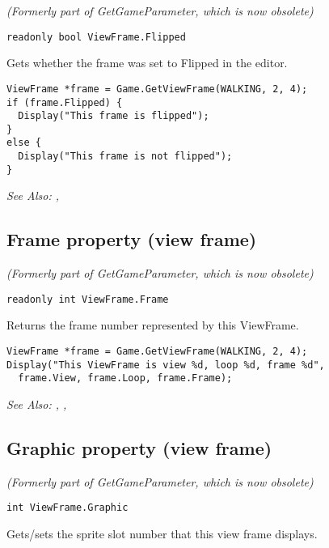 \it{(Formerly part of GetGameParameter, which is now obsolete)}

\begin{verbatim}
readonly bool ViewFrame.Flipped
\end{verbatim}
Gets whether the frame was set to Flipped in the editor.

\begin{verbatim}
ViewFrame *frame = Game.GetViewFrame(WALKING, 2, 4);
if (frame.Flipped) {
  Display("This frame is flipped");
}
else {
  Display("This frame is not flipped");
}
\end{verbatim}

\it{See Also:} ,


\subsection{Frame property (view frame)}\label{ViewFrame.Frame}%

\it{(Formerly part of GetGameParameter, which is now obsolete)}

\begin{verbatim}
readonly int ViewFrame.Frame
\end{verbatim}
Returns the frame number represented by this ViewFrame.

\begin{verbatim}
ViewFrame *frame = Game.GetViewFrame(WALKING, 2, 4);
Display("This ViewFrame is view %d, loop %d, frame %d",
  frame.View, frame.Loop, frame.Frame);
\end{verbatim}

\it{See Also:} ,
,


\subsection{Graphic property (view frame)}\label{ViewFrame.Graphic}%

\it{(Formerly part of GetGameParameter, which is now obsolete)}

\begin{verbatim}
int ViewFrame.Graphic
\end{verbatim}
Gets/sets the sprite slot number that this view frame displays.

